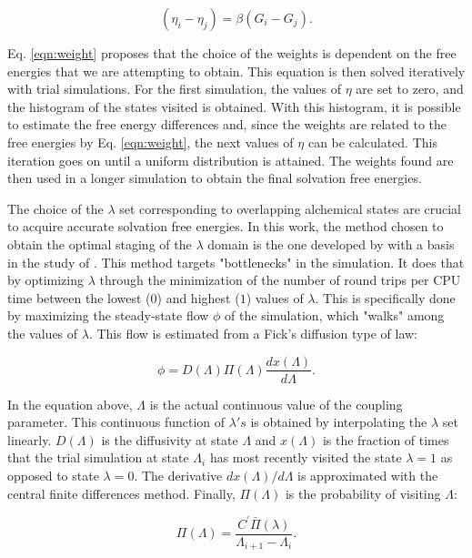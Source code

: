 \begin{equation}
(\eta_{i} - \eta_{j}) = \beta(G_i-G_j).
\label{eqn:weight}
\end{equation}

Eq. \eqref{eqn:weight} proposes that the choice of the weights is dependent on the free energies that we are attempting to obtain. This equation is then solved iteratively with trial simulations. For the first simulation, the values of $\eta$ are set to zero, and the histogram of the states visited is obtained. With this histogram, it is possible to estimate the free energy differences and, since the weights are related to the free energies by Eq. \eqref{eqn:weight}, the next values of $\eta$ can be calculated. This iteration goes on until a uniform distribution is attained. The weights found are then used in a longer simulation to obtain the final solvation free energies.

The choice of the $\lambda$ set corresponding to overlapping alchemical states are crucial to acquire accurate solvation free energies. In this work, the method chosen to obtain the optimal staging of the $\lambda$ domain is the one developed by  with a basis in the study of  . This method targets "bottlenecks" in the simulation. It does that by optimizing $\lambda$ through the minimization of the number of round trips per CPU time between the lowest ($0$) and highest ($1$) values of $\lambda$. This is specifically done by maximizing the steady-state flow $\phi$ of the simulation, which "walks" among the values of $\lambda$. This flow is estimated from a Fick's diffusion type of law:

\begin{equation}
\phi = D(\Lambda) \Pi (\Lambda) \dfrac{dx(\Lambda)}{d \Lambda}.
\label{eqn:stream}
\end{equation}

In the equation above, $\Lambda$ is the actual continuous value of the coupling parameter. This continuous function of $\lambda 's$ is obtained by interpolating the $\lambda$ set linearly. $D(\Lambda)$ is the diffusivity at  state $\Lambda$ and $x(\Lambda)$ is the fraction of times that the trial simulation at state $\Lambda_{i}$ has most recently visited the state $\lambda=1$ as opposed to state $\lambda=0$. The derivative ${dx(\Lambda)}/{d \Lambda}$ is approximated with the central finite differences method. Finally, $\Pi (\Lambda)$ is the probability of visiting $\Lambda$:

\begin{equation}
\Pi (\Lambda) = \dfrac{C^{'} \bar{\Pi} (\lambda)}{\Lambda_{i+1} - \Lambda_{i}}.
\label{eqn:plambda}
\end{equation}

